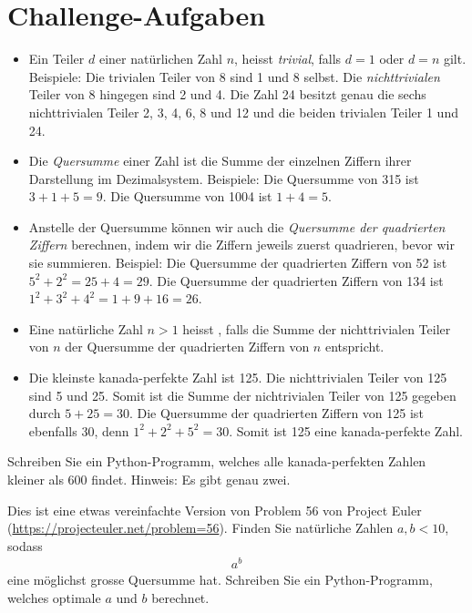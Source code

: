 \chapter{Challenge-Aufgaben}

\begin{itemize}
    \item Ein Teiler $d$ einer natürlichen Zahl $n$, heisst \textit{trivial}, falls $d = 1$ oder $d = n$ gilt. Beispiele: Die trivialen Teiler von 8 sind 1 und 8 selbst. Die \textit{nichttrivialen} Teiler von 8 hingegen sind 2 und 4. Die Zahl 24 besitzt genau die sechs nichttrivialen Teiler 2, 3, 4, 6, 8 und 12 und die beiden trivialen Teiler 1 und 24.
    \item Die \textit{Quersumme} einer Zahl ist die Summe der einzelnen Ziffern ihrer Darstellung im Dezimalsystem. Beispiele: Die Quersumme von 315 ist $3 + 1 + 5 = 9$. Die Quersumme von 1004 ist $1 + 4 = 5$.
    \item Anstelle der Quersumme können wir auch die \textit{Quersumme der quadrierten Ziffern} berechnen, indem wir die Ziffern jeweils zuerst quadrieren, bevor wir sie summieren. Beispiel: Die Quersumme der quadrierten Ziffern von 52 ist $5^2 + 2^2 = 25 + 4 = 29$. Die Quersumme der quadrierten Ziffern von 134 ist $1^2 + 3^2 + 4^2 = 1 + 9 + 16 = 26$.
    \item Eine natürliche Zahl $n>1$ heisst , falls die Summe der nichttrivialen Teiler von $n$ der Quersumme der quadrierten Ziffern von $n$ entspricht.
    \item Die kleinste kanada-perfekte Zahl ist 125. Die nichttrivialen Teiler von 125 sind 5 und 25. Somit ist die Summe der nichtrivialen Teiler von 125 gegeben durch $5 + 25 = 30$. Die Quersumme der quadrierten Ziffern von 125 ist ebenfalls 30, denn $1^2 + 2^2 + 5^2 = 30$. Somit ist 125 eine kanada-perfekte Zahl.
\end{itemize}

\noindent
Schreiben Sie ein Python-Programm, welches alle kanada-perfekten Zahlen kleiner als 600 findet. Hinweis: Es gibt genau zwei.

\clearpage

Dies ist eine etwas vereinfachte Version von Problem 56 von Project Euler (\url{https://projecteuler.net/problem=56}). Finden Sie natürliche Zahlen $a, b < 10$, sodass
\begin{align*}
    a^b
\end{align*}
eine möglichst grosse Quersumme hat. Schreiben Sie ein Python-Programm, welches optimale $a$ und $b$ berechnet.


